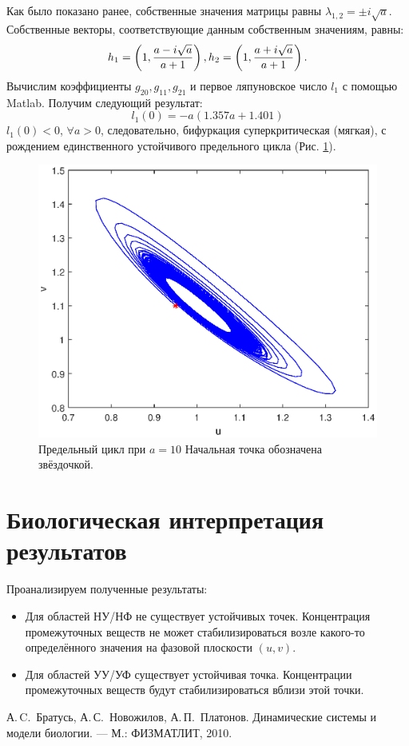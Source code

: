 \documentclass[12pt]{article}
\begin{document}
Как было показано ранее, собственные значения матрицы равны $\lambda_{1,2} = \pm i\sqrt{a}$.
Собственные векторы, соответствующие данным собственным значениям, равны:
$$
    h_1 = \left(1, \frac{a - i\sqrt{a}}{a+1}\right),\\
    h_2 = \left(1, \frac{a + i\sqrt{a}}{a+1}\right).
$$
Вычислим коэффициенты $g_{20}, g_{11}, g_{21}$ и первое ляпуновское число $l_1$ с помощью Matlab. Получим следующий результат:
$$
    l_1(0) = -a(1.357a + 1.401) 
$$
$l_1(0) < 0$, $\forall a > 0$, следовательно, бифуркация суперкритическая (мягкая), с рождением единственного устойчивого предельного цикла (Рис. \ref{limpic}).
\begin{figure}[H]
    \begin{center}
    \includegraphics[width=1\textwidth]{limitcycle.eps}
    \caption{Предельный цикл при $a = 10$ Начальная точка обозначена звёздочкой.}
    \label{limpic}
    \end{center}
\end{figure}
\section{Биологическая интерпретация результатов}
Проанализируем полученные результаты:
\begin{itemize}
    \item Для областей НУ/НФ не существует устойчивых точек. Концентрация промежуточных веществ не может стабилизироваться возле какого-то определённого значения на фазовой плоскости $(u, v)$.
    \item Для областей УУ/УФ существует устойчивая точка. Концентрации промежуточных веществ будут стабилизироваться вблизи этой точки.
\end{itemize}

\newpage
\begin{thebibliography}{9}
    \bibitem[1]{} А.\,C.~Братусь, А.\,С.~Новожилов, А.\,П.~Платонов. Динамические системы и модели биологии. — М.: ФИЗМАТЛИТ, 2010.
\end{thebibliography}
\end{document}
